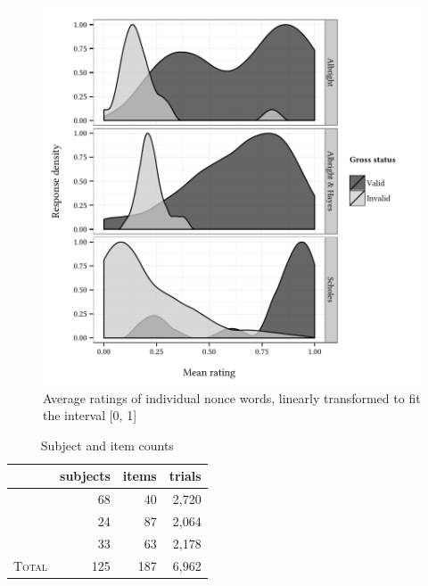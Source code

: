 \begin{figure}
\centering
\includegraphics{density.pdf}
\caption{Average ratings of individual nonce words, linearly transformed to fit the interval [0, 1]}
\label{dsn}
\end{figure}

\begin{table}
\centering
\begin{tabular}{l rrr}
\toprule
                        & subjects & items & trials \\
\midrule
\citealt{Albright2007}  & 68       & 40    & 2,720  \\
\citealt{Albright2003a} & 24       & 87    & 2,064  \\
\citealt{Scholes1966}   & 33       & 63    & 2,178  \\
\midrule
\textsc{Total}          & 125      & 187   & 6,962  \\
\bottomrule
\end{tabular}
\caption{Subject and item counts}
\label{counts}
\end{table}

